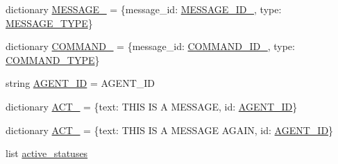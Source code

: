 \begin{DoxyCompactItemize}
\item 
dictionary \hyperlink{namespaceparlai_1_1mturk_1_1core_1_1dev_1_1test_1_1test__socket__manager_ab17209f582b387d57d61b4743c452c78}{M\+E\+S\+S\+A\+G\+E\+\_} = \{\textquotesingle{}message\+\_\+id\textquotesingle{}\+: \hyperlink{namespaceparlai_1_1mturk_1_1core_1_1dev_1_1test_1_1test__socket__manager_a4047856e009ae0dafa34b8ade954eb7c}{M\+E\+S\+S\+A\+G\+E\+\_\+\+I\+D\+\_}, \textquotesingle{}type\textquotesingle{}\+: \hyperlink{namespaceparlai_1_1mturk_1_1core_1_1dev_1_1test_1_1test__socket__manager_af8cab4fa9e4add6b6a3c8fd105c9df17}{M\+E\+S\+S\+A\+G\+E\+\_\+\+T\+Y\+PE}\}
\item 
dictionary \hyperlink{namespaceparlai_1_1mturk_1_1core_1_1dev_1_1test_1_1test__socket__manager_a855c1d6cdb0b5dc4964d28584e286c35}{C\+O\+M\+M\+A\+N\+D\+\_} = \{\textquotesingle{}message\+\_\+id\textquotesingle{}\+: \hyperlink{namespaceparlai_1_1mturk_1_1core_1_1dev_1_1test_1_1test__socket__manager_a636a3f531ee83785c992c9a433d9b17f}{C\+O\+M\+M\+A\+N\+D\+\_\+\+I\+D\+\_}, \textquotesingle{}type\textquotesingle{}\+: \hyperlink{namespaceparlai_1_1mturk_1_1core_1_1dev_1_1test_1_1test__socket__manager_afaf4e06d721fc27fdf11dcedddf6fcac}{C\+O\+M\+M\+A\+N\+D\+\_\+\+T\+Y\+PE}\}
\item 
string \hyperlink{namespaceparlai_1_1mturk_1_1core_1_1dev_1_1test_1_1test__socket__manager_a5fdc802343f5d06377eb46c09f996c57}{A\+G\+E\+N\+T\+\_\+\+ID} = \textquotesingle{}A\+G\+E\+N\+T\+\_\+\+ID\textquotesingle{}
\item 
dictionary \hyperlink{namespaceparlai_1_1mturk_1_1core_1_1dev_1_1test_1_1test__socket__manager_a47700a067f1aebdfcd80af21309076d4}{A\+C\+T\+\_} = \{\textquotesingle{}text\textquotesingle{}\+: \textquotesingle{}T\+H\+IS IS A M\+E\+S\+S\+A\+GE\textquotesingle{}, \textquotesingle{}id\textquotesingle{}\+: \hyperlink{namespaceparlai_1_1mturk_1_1core_1_1dev_1_1test_1_1test__socket__manager_a5fdc802343f5d06377eb46c09f996c57}{A\+G\+E\+N\+T\+\_\+\+ID}\}
\item 
dictionary \hyperlink{namespaceparlai_1_1mturk_1_1core_1_1dev_1_1test_1_1test__socket__manager_ac371cdfe489b9adac1971b06eeb9ffff}{A\+C\+T\+\_} = \{\textquotesingle{}text\textquotesingle{}\+: \textquotesingle{}T\+H\+IS IS A M\+E\+S\+S\+A\+GE A\+G\+A\+IN\textquotesingle{}, \textquotesingle{}id\textquotesingle{}\+: \hyperlink{namespaceparlai_1_1mturk_1_1core_1_1dev_1_1test_1_1test__socket__manager_a5fdc802343f5d06377eb46c09f996c57}{A\+G\+E\+N\+T\+\_\+\+ID}\}
\item 
list \hyperlink{namespaceparlai_1_1mturk_1_1core_1_1dev_1_1test_1_1test__socket__manager_a088f2b99be8319d11ea3b411055ec196}{active\+\_\+statuses}

\end{DoxyCompactItemize}
